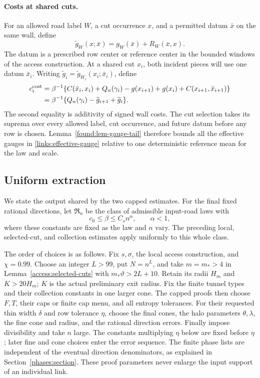 \paragraph{Costs at shared cuts.}
For an allowed road label \(W\), a cut occurrence \(x\), and a
permitted datum \(\bar x\) on the same wall, define
\begin{equation}
 \widetilde g_W(x;\bar x)=g_W(\bar x)+R_W(\bar x,x).
 \label{links:effective-gauge}
\end{equation}
The datum is a prescribed row center or reference center in the
bounded windows of the access construction. At a shared cut \(x_i\),
both incident pieces will use one datum \(\bar x_i\). Writing
\(\widetilde g_i=\widetilde g_{W_i}(x_i;\bar x_i)\), define
\begin{align}
 c_i^{\rm cost}
 &=\beta^{-1}\{C(\bar x_i,x_i)+Q_n(\gamma_i)
       -g(x_{i+1})+g(x_i)+C(x_{i+1},\bar x_{i+1})\}\notag\\
 &=\beta^{-1}\{Q_n(\gamma_i)-\widetilde g_{i+1}+\widetilde g_i\}.
 \label{links:piece-cost}
\end{align}
The second equality is additivity of signed wall costs. The cut
selection takes its suprema over every allowed label, cut occurrence,
and future datum before any row is chosen. Lemma~\ref{found:lem-gauge-tail}
therefore bounds all the effective gauges in
\eqref{links:effective-gauge} relative to one deterministic reference
mean for the law and scale.

\subsection{Uniform extraction}

We state the output shared by the two capped estimates. For the final
fixed rational directions, let \(\mathfrak R_n\) be the class of
admissible input-road laws with
\[
 c_0\le\beta\le C_s n^\alpha,\qquad \alpha<1,
\]
where these constants are fixed as the law and \(n\) vary. The
preceding local, selected-cut, and collection estimates apply
uniformly to this whole class.

The order of choices is as follows. Fix \(s,\sigma\), the local access
construction, and \(\chi=0.99\). Choose an integer \(L>99\), put
\(N=n^L\), and take \(m=m_*>4\) in Lemma~\ref{access:selected-cuts}
with \(m_*\vartheta>2L+10\). Retain its radii \(H_m\) and \(K>20H_m\);
\(K\) is the actual preliminary exit radius. Fix the finite tunnel
types and their collection constants in one larger cone. The capped
proofs then choose \(F,T\), their caps or finite cap menu, and all
entropy tolerances. For their requested thin width \(\delta\) and
row tolerance \(\eta\), choose the final cones, the halo parameters
\(\theta,\lambda\), the fine cone and radius, and the rational
direction errors. Finally impose divisibility and take \(n\) large.
The constants multiplying \(\eta\) below are fixed before \(\eta\);
later fine and cone choices enter the error sequence. The finite phase
lists are independent of the eventual direction denominators, as
explained in Section~\ref{phases:section}. These proof parameters
never enlarge the input support of an individual link.

